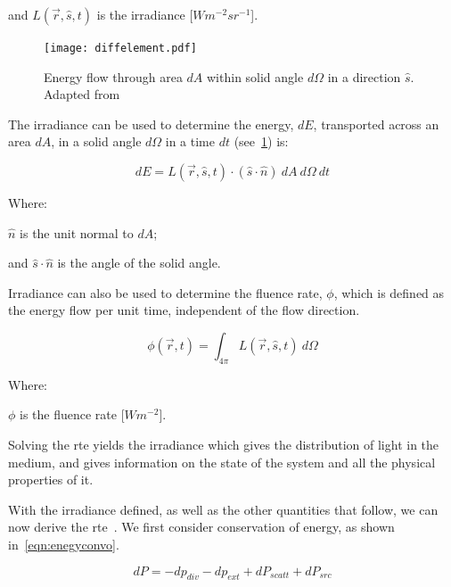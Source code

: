\indent and $L(\vec{r},\hat{s},t)$ is the irradiance [$W m^{-2} sr^{-1}$].

\medskip

\begin{figure}[!htb]
	\centering
	\texttt{[image: diffelement.pdf]}
	\caption{Energy flow through area $dA$ within solid angle $d\Omega$ in a direction $\hat{s}$. Adapted from~\cite{wang2012biomedical,chandrasekhar2013radiative}}
	\label{fig:energydiag1}
\end{figure}

The irradiance can be used to determine the energy, $dE$, transported across an area $dA$, in a solid angle $d\Omega$ in a time $dt$ (see~\cref{fig:energydiag1}) is:

\begin{equation}
	dE = L(\vec{r},\hat{s},t) \cdot (\hat{s} \cdot \hat{n})\ dA\ d\Omega\ dt
\end{equation}

\noindent Where:

\indent $\hat{n}$ is the unit normal to $dA$;

\indent and $\hat{s}\cdot\hat{n}$ is the angle of the solid angle.

\medskip

Irradiance can also be used to determine the fluence rate, $\phi$, which is defined as the energy flow per unit time, independent of the flow direction.

\begin{equation}
	\phi(\vec{r},t)=\int_{4\pi}L(\vec{r},\hat{s},t)\ d\Omega
\end{equation}

\noindent Where:

\indent $\phi$ is the fluence rate [$W m^{-2}$].

\medskip

Solving the \gls*{rte} yields the irradiance which gives the distribution of light in the medium, and gives information on the state of the system and all the physical properties of it.

With the irradiance defined, as well as the other quantities that follow, we can now derive the \gls*{rte}~\cite{chandrasekhar2013radiative,wang2012biomedical}. We first consider conservation of energy, as shown in~\cref{eqn:enegyconvo}.

\begin{equation}
	dP = -dp_{div} - dp_{ext} + dP_{scatt} + dP_{src}
	\label{eqn:enegyconvo}
\end{equation}

